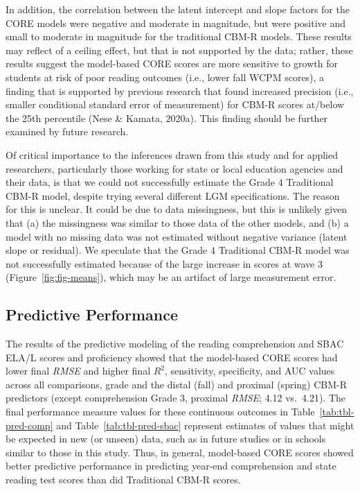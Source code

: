 \documentclass[
  english,
  man, fleqn, noextraspace]{apa6}
\begin{document}
In addition, the correlation between the latent intercept and slope factors for the CORE models were negative and moderate in magnitude, but were positive and small to moderate in magnitude for the traditional CBM-R models. These results may reflect of a ceiling effect, but that is not supported by the data; rather, these results suggest the model-based CORE scores are more sensitive to growth for students at risk of poor reading outcomes (i.e., lower fall WCPM scores), a finding that is supported by previous research that found increased precision (i.e., smaller conditional standard error of measurement) for CBM-R scores at/below the 25th percentile (Nese \& Kamata, 2020a). This finding should be further examined by future research.

Of critical importance to the inferences drawn from this study and for applied researchers, particularly those working for state or local education agencies and their data, is that we could not successfully estimate the Grade 4 Traditional CBM-R model, despite trying several different LGM specifications. The reason for this is unclear. It could be due to data missingness, but this is unlikely given that (a) the missingness was similar to those data of the other models, and (b) a model with no missing data was not estimated without negative variance (latent slope or residual). We speculate that the Grade 4 Traditional CBM-R model was not successfully estimated because of the large increase in scores at wave 3 (Figure~\ref{fig:fig-means}), which may be an artifact of large measurement error.

\hypertarget{predictive-performance}{%
\subsection{Predictive Performance}\label{predictive-performance}}

The results of the predictive modeling of the reading comprehension and SBAC ELA/L scores and proficiency showed that the model-based CORE scores had lower final \emph{RMSE} and higher final \(R^2\), sensitivity, specificity, and AUC values across all comparisons, grade and the distal (fall) and proximal (spring) CBM-R predictors (except comprehension Grade 3, proximal \emph{RMSE}; 4.12 vs.~4.21). The final performance measure values for these continuous outcomes in Table~\ref{tab:tbl-pred-comp} and Table~\ref{tab:tbl-pred-sbac} represent estimates of values that might be expected in new (or unseen) data, such as in future studies or in schools similar to those in this study. Thus, in general, model-based CORE scores showed better predictive performance in predicting year-end comprehension and state reading test scores than did Traditional CBM-R scores.
\end{document}
